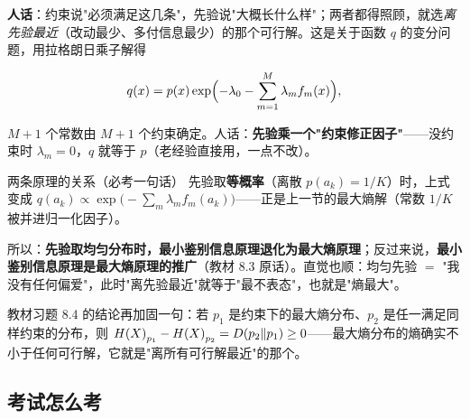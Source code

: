\textbf{人话}：约束说"必须满足这几条"，先验说"大概长什么样"；两者都得照顾，就选\emph{离先验最近}（改动最少、多付信息最少）的那个可行解。这是关于函数 $q$ 的变分问题，用拉格朗日乘子解得

\begin{align*}
q(x)=p(x)\exp\Bigl(-\lambda_0-\sum_{m=1}^{M}\lambda_m f_m(x)\Bigr),
\end{align*}

$M+1$ 个常数由 $M+1$ 个约束确定。人话：\textbf{先验乘一个"约束修正因子"}——没约束时 $\lambda_m=0$，$q$ 就等于 $p$（老经验直接用，一点不改）。

\begin{idea}{两条原理的关系（必考一句话）}
先验取\textbf{等概率}（离散 $p(a_k)=1/K$）时，上式变成 $q(a_k)\propto\exp\bigl(-\sum_m\lambda_m f_m(a_k)\bigr)$——正是上一节的最大熵解（常数 $1/K$ 被并进归一化因子）。

所以：\textbf{先验取均匀分布时，最小鉴别信息原理退化为最大熵原理}；反过来说，\textbf{最小鉴别信息原理是最大熵原理的推广}（教材 8.3 原话）。直觉也顺：均匀先验 $=$ "我没有任何偏爱"，此时"离先验最近"就等于"最不表态"，也就是"熵最大"。

教材习题 8.4 的结论再加固一句：若 $p_1$ 是约束下的最大熵分布、$p_2$ 是任一满足同样约束的分布，则 $H\!\left(X\right)_{p_1}-H\!\left(X\right)_{p_2}=D(p_2\|p_1)\ge0$——最大熵分布的熵确实不小于任何可行解，它就是"离所有可行解最近"的那个。
\end{idea}

\subsection{考试怎么考}

